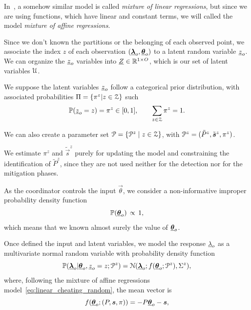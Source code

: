 \documentclass[../main.tex]{subfiles}
\begin{document}
In~\cite{FariaSoromenho2010}, a somehow similar model is called \emph{mixture of linear regressions}, but since we are using \pwa{} functions, which have linear and constant terms, we will called the model \emph{mixture of affine regressions}.

Since we don't known the partitions or the belonging of each observed point, we associate the index $z$ of each observation ${({\underline{\boldsymbol{\lambda}}}_{o}, {\underline{\boldsymbol{\theta}}}_{o})}$ to a latent random variable ${\underline{z}_{o}}$.
We can organize the $\underline{z}_{o}$ variables into ${\underline{Z}\in\mathbb{R}^{1\times O}}$, which is our set of latent variables $\mathcal{U}$.

We suppose the latent variables $\underline{z}_{o}$ follow a categorical prior distribution, with associated probabilities ${\Pi=\{\pi^{z}|z\in\mathcal{Z}\}}$ such
\[\mathbb{P}(\underline{z}_{o}=z)=\pi^{z} \in [0,1], \qquad \sum_{z\in\mathcal{Z}} \pi^{z} = 1.
\]

We can also create a parameter set ${\mathcal{P}=\{\mathcal{P}^{z}\mid z\in\mathcal{Z}\}}$, with ${\mathcal{P}^{z}=(\tilde{P}^{z},\tilde{\boldsymbol{s}}^{z},\pi^{z})}$.

\begin{remark}
  We estimate $\pi^{z}$ and $\tilde{\vec{s}}^{z}$ purely for updating the model and constraining the identification of $\tilde{P}^{z}$, since they are not used neither for the detection nor for the mitigation phases.
\end{remark}

As the coordinator controls the input $\vec{\theta}$, we consider a non-informative improper probability density function~\cite{ChristensenEtAl2010}
\[
  \mathbb{P}({\underline{\boldsymbol{\theta}}}_{o}) \,\propto \,1,
\]
which means that we known almost surely the value of ${\underline{\boldsymbol{\theta}}}_{o}$.

Once defined the input and latent variables, we model the response $\underline{\lambda}_{o}$ as a multivariate normal random variable with probability density function
\begin{equation}
  \label{eq:multivariate_gaussian}
\mathbb{P}({\underline{\boldsymbol{\lambda}}}_{o}|{\underline{\boldsymbol{\theta}}}_{o},\underline{z}_{o}=z; \mathcal{P}^{z}) = \mathcal{N}({\underline{\boldsymbol{\lambda}}}_{o};f({\underline{\boldsymbol{\theta}}}_{o};\mathcal{P}^{z}),{\Sigma^{z}}),
\end{equation}
where, following the mixture of affine regressions model~\eqref{eq:linear_cheating_random}, the mean vector is
\begin{equation}
  f({\underline{\boldsymbol{\theta}}}_{o};(P,\boldsymbol{s},\pi))=-{P}{\underline{\boldsymbol{\theta}}}_{o}-{\boldsymbol{s}},
\end{equation}
\end{document}

